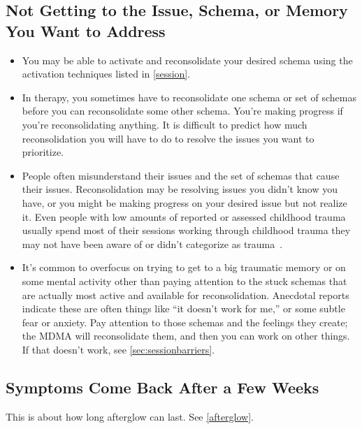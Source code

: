 \documentclass[11pt,oneside]{book}
\let\cite\parencite
\begin{document}
\subsection{Not Getting to the Issue, Schema, or Memory You Want to Address}
\begin{itemize}
    \item You may be able to activate and reconsolidate your desired schema using the activation techniques listed in \cref{session}.
    \item In therapy, you sometimes have to reconsolidate one schema or set of schemas before you can reconsolidate some other schema. You're making progress if you're reconsolidating anything. It is difficult to predict how much reconsolidation you will have to do to resolve the issues you want to prioritize.
    \item People often misunderstand their issues and the set of schemas that cause their issues. Reconsolidation may be resolving issues you didn't know you have, or you might be making progress on your desired issue but not realize it. Even people with low amounts of reported or assessed childhood trauma usually spend most of their sessions working through childhood trauma they may not have been aware of or didn't categorize as trauma~\cite{monashMDMA}.
    \item It's common to overfocus on trying to get to a big traumatic memory or on some mental activity other than paying attention to the stuck schemas that are actually most active and available for reconsolidation. Anecdotal reports indicate these are often things like \enquote{it doesn't work for me,} or some subtle fear or anxiety. Pay attention to those schemas and the feelings they create; the MDMA will reconsolidate them, and then you can work on other things. If that doesn't work, see \cref{sec:sessionbarriers}.
\end{itemize}

\subsection{Symptoms Come Back After a Few Weeks}
This is about how long afterglow can last. See \cref{afterglow}.
\end{document}
